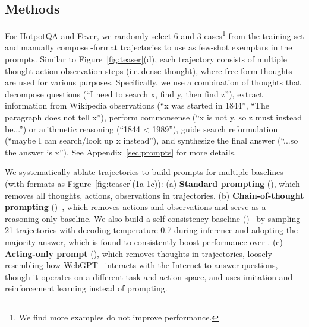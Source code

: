 \subsection{Methods}\label{sec:methods}

 For HotpotQA and Fever, we randomly select 6 and 3 cases\footnote{We find more examples do not improve performance.} from the training set and manually compose \model{}-format trajectories to use as few-shot exemplars in the prompts. Similar to Figure~\ref{fig:teaser}(d), each trajectory consists of multiple thought-action-observation steps (i.e.\,dense thought), where free-form thoughts are used for various purposes.  {Specifically, we use a combination of thoughts that decompose questions (``I need to search x, find y, then find z''), extract information from Wikipedia observations (``x was started in 1844'', ``The paragraph does not tell x''), perform commonsense (``x is not y, so z must instead be...'') or arithmetic reasoning (``1844 < 1989''), guide search reformulation (``maybe I can search/look up x instead''), and synthesize the final answer (``...so the answer is x''). See Appendix~\ref{sec:prompts} for more details.}

 We systematically ablate \model{}  trajectories to build prompts for multiple baselines (with formats as Figure~\ref{fig:teaser}(1a-1c)): 
(a) \textbf{Standard prompting} (\palm{}), which removes all thoughts, actions, observations in \model{} trajectories. 
(b) \textbf{Chain-of-thought prompting} (\reason{})~\citep{wei2022chain}, which removes actions and observations and serve as a reasoning-only baseline. We also build a self-consistency baseline (\reasons{})~\citep{wang2022self-consistency,wang2022rationale} by sampling 21 \reason{} trajectories with decoding temperature 0.7 during inference and adopting the majority answer, which is found to consistently boost performance over \reason{}. 
(c) \textbf{Acting-only prompt} (\act{}), which removes thoughts in \model{} trajectories, loosely resembling how WebGPT~\citep{nakano2021webgpt} interacts with the Internet to answer questions, though it operates on a different task and action space, and uses imitation and reinforcement learning instead of prompting.

